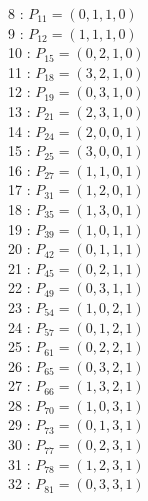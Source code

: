 \documentclass{article}
\begin{document}
{\begin{multicols}{3}
8 : $P_{11}=( 0, 1, 1, 0 )$\\
9 : $P_{12}=( 1, 1, 1, 0 )$\\
10 : $P_{15}=( 0, 2, 1, 0 )$\\
11 : $P_{18}=( 3, 2, 1, 0 )$\\
12 : $P_{19}=( 0, 3, 1, 0 )$\\
13 : $P_{21}=( 2, 3, 1, 0 )$\\
14 : $P_{24}=( 2, 0, 0, 1 )$\\
15 : $P_{25}=( 3, 0, 0, 1 )$\\
16 : $P_{27}=( 1, 1, 0, 1 )$\\
17 : $P_{31}=( 1, 2, 0, 1 )$\\
18 : $P_{35}=( 1, 3, 0, 1 )$\\
19 : $P_{39}=( 1, 0, 1, 1 )$\\
20 : $P_{42}=( 0, 1, 1, 1 )$\\
21 : $P_{45}=( 0, 2, 1, 1 )$\\
22 : $P_{49}=( 0, 3, 1, 1 )$\\
23 : $P_{54}=( 1, 0, 2, 1 )$\\
24 : $P_{57}=( 0, 1, 2, 1 )$\\
25 : $P_{61}=( 0, 2, 2, 1 )$\\
26 : $P_{65}=( 0, 3, 2, 1 )$\\
27 : $P_{66}=( 1, 3, 2, 1 )$\\
28 : $P_{70}=( 1, 0, 3, 1 )$\\
29 : $P_{73}=( 0, 1, 3, 1 )$\\
30 : $P_{77}=( 0, 2, 3, 1 )$\\
31 : $P_{78}=( 1, 2, 3, 1 )$\\
32 : $P_{81}=( 0, 3, 3, 1 )$\\
\end{multicols}


%


%


}%
\end{document}
